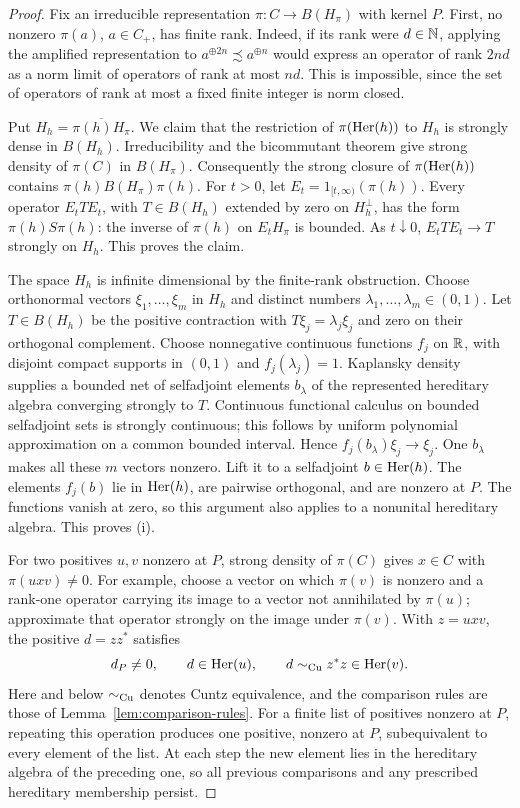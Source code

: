 \begin{proof}
Fix an irreducible representation $\pi:C\to B(H_\pi)$ with kernel
$P$.  First, no nonzero $\pi(a)$, $a\in C_+$, has finite rank.
Indeed, if its rank were $d\in\mathbb N$, applying the amplified
representation to
$a^{\oplus 2n}\precsim a^{\oplus n}$ would express an operator of
rank $2nd$ as a norm limit of operators of rank at most $nd$.
This is impossible, since the set of operators of rank at most a
fixed finite integer is norm closed.

Put $H_h=\overline{\pi(h)H_\pi}$.  We claim that the restriction of
$\pi(\operatorname{Her}(h))$ to $H_h$ is strongly dense in $B(H_h)$.
Irreducibility and the bicommutant theorem
\cite[I.9.1.1]{Blackadar} give strong density of $\pi(C)$ in $B(H_\pi)$.  Consequently the strong closure of
$\pi(\operatorname{Her}(h))$ contains $\pi(h)B(H_\pi)\pi(h)$.
For $t>0$, let $E_t=1_{[t,\infty)}(\pi(h))$.  Every operator
$E_tTE_t$, with $T\in B(H_h)$ extended by zero on $H_h^\perp$, has
the form $\pi(h)S\pi(h)$: the inverse of $\pi(h)$ on $E_tH_\pi$
is bounded.  As $t\downarrow0$, $E_tTE_t\to T$ strongly on $H_h$.
This proves the claim.

The space $H_h$ is infinite dimensional by the finite-rank
obstruction.  Choose orthonormal vectors $\xi_1,\ldots,\xi_m$ in
$H_h$ and distinct numbers $\lambda_1,\ldots,\lambda_m\in(0,1)$.
Let $T\in B(H_h)$ be the positive contraction with
$T\xi_j=\lambda_j\xi_j$ and zero on their orthogonal complement.
Choose nonnegative continuous functions $f_j$ on $\mathbb R$, with disjoint
compact supports in $(0,1)$ and $f_j(\lambda_j)=1$.
Kaplansky density \cite[I.9.1.3]{Blackadar} supplies a bounded net of selfadjoint elements
$b_\lambda$ of the represented hereditary algebra converging
strongly to $T$.  Continuous functional calculus on bounded
selfadjoint sets is strongly continuous; this follows by uniform
polynomial approximation on a common bounded interval.  Hence
$f_j(b_\lambda)\xi_j\to\xi_j$.  One $b_\lambda$ makes all these
$m$ vectors nonzero.  Lift it to a selfadjoint
$b\in\operatorname{Her}(h)$.  The elements $f_j(b)$ lie in $\operatorname{Her}(h)$, are
pairwise orthogonal, and are nonzero at $P$.  The functions vanish
at zero, so this argument also applies to a nonunital hereditary
algebra.  This proves \textup{(i)}.

For two positives $u,v$ nonzero at $P$, strong density of $\pi(C)$
gives $x\in C$ with $\pi(uxv)\ne0$.  For example, choose a vector
on which $\pi(v)$ is nonzero and a rank-one operator carrying its
image to a vector not annihilated by $\pi(u)$; approximate that
operator strongly on the image under $\pi(v)$.  With $z=uxv$, the positive
$d=zz^*$ satisfies
\[
 d_P\ne0,\qquad d\in\operatorname{Her}(u),\qquad
 d\sim_{\mathrm{Cu}} z^*z\in\operatorname{Her}(v).
\]
Here and below $\sim_{\mathrm{Cu}}$ denotes Cuntz equivalence, and the comparison
rules are those of Lemma~\ref{lem:comparison-rules}.
For a finite list of positives nonzero at $P$, repeating this
operation produces one positive, nonzero at $P$, subequivalent to
every element of the list.  At each step the new element lies in
the hereditary algebra of the preceding one, so all previous
comparisons and any prescribed hereditary membership persist.


\end{proof}
